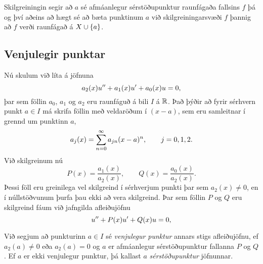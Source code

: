 Skilgreiningin segir að $a$ sé afmáanlegur sérstöðupunktur 
raunfágaða fallsins $f$ þá og því aðeins að 
hægt sé að bæta punktinum $a$ við skilgreiningarsvæði $f$ þannig að $f$
verði raunfágað á $X\cup {\{a\}}$.


\subsection*{Venjulegir punktar}

Nú skulum við líta á jöfnuna 
 \begin{equation*}a_2(x)u{\sp{\prime\prime}}+a_1(x)u{\sp{\prime}}+a_0(x)u=0,\label{3.2.1}
 \end{equation*}
þar sem föllin $a_0$, $a_1$ og $a_2$ eru raunfáguð á bili $I$ á ${\mathbb R}$.
Það þýðir að fyrir sérhvern punkt $a\in I$ má skrifa föllin með
veldaröðum í $(x-a)$,  sem eru samleitnar í grennd um punktinn $a$,
 $$a_j(x)=\sum_{n=0}\sp \infty a_{jn}(x-a)\sp n, \qquad j=0,1,2.
 $$
Við skilgreinum nú  
 \begin{equation*}P(x)=\dfrac{a_1(x)}{a_2(x)}, \qquad 
Q(x)=\dfrac{a_0(x)}{a_2(x)}.\label{3.2.2}
 \end{equation*}
Þessi föll eru greinilega vel skilgreind í sérhverjum punkti þar sem
$a_2(x)\neq 0$, en í núllstöðvunum þurfa þau ekki að vera skilgreind.
Þar sem föllin $P$ og $Q$ eru skilgreind fáum við jafngilda
afleiðujöfnu
 \begin{equation*}u{\sp{\prime\prime}}+P(x)u{\sp{\prime}}+Q(x)u=0,\label{3.2.3}
 \end{equation*}

\begin{sk}
Við segjum að punkturinn $a\in I$ sé {\it venjulegur
punktur} annars stigs
afleiðujöfnu, ef
$a_2(a)\neq 0$ eða $a_2(a)=0$ og $a$ er afmáanlegur sérstöðupunktur
fallanna $P$ og $Q$.  Ef $a$ er ekki venjulegur punktur, þá kallast $a$ {\it
sérstöðupunktur}
jöfnunnar. 
\end{sk}


